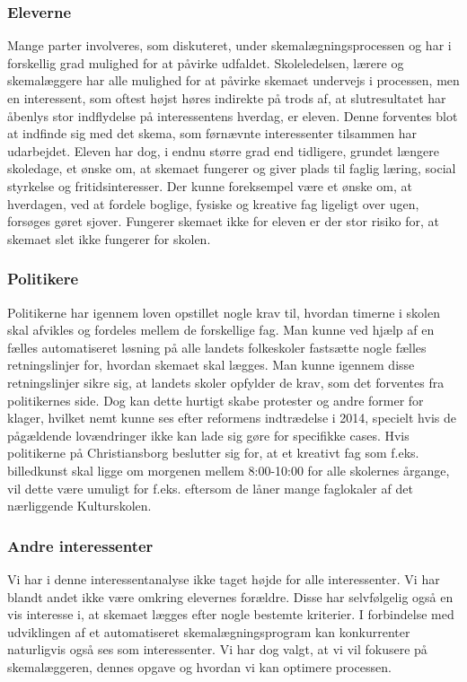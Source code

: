 \subsubsection{Eleverne}
Mange parter involveres, som diskuteret, under skemalægningsprocessen og har i forskellig grad mulighed for at påvirke udfaldet. Skoleledelsen, lærere og skemalæggere har alle mulighed for at påvirke skemaet undervejs i processen, men en interessent, som oftest højst høres indirekte på trods af, at slutresultatet har åbenlys stor indflydelse på interessentens hverdag, er eleven. Denne forventes blot at indfinde sig med det skema, som førnævnte interessenter tilsammen har udarbejdet. Eleven har dog, i endnu større grad end tidligere, grundet længere skoledage, et ønske om, at skemaet fungerer og giver plads til faglig læring, social styrkelse og fritidsinteresser. Der kunne foreksempel være et ønske om, at hverdagen, ved at fordele boglige, fysiske og kreative fag ligeligt over ugen, forsøges gøret sjover. Fungerer skemaet ikke for eleven er der stor risiko for, at skemaet slet ikke fungerer for skolen.

\subsubsection{Politikere}
Politikerne har igennem loven opstillet nogle krav til, hvordan timerne i skolen skal afvikles og fordeles mellem de forskellige fag. Man kunne ved hjælp af en fælles automatiseret løsning på alle landets folkeskoler fastsætte nogle fælles retningslinjer for, hvordan skemaet skal lægges. Man kunne igennem disse retningslinjer sikre sig, at landets skoler opfylder de krav, som det forventes fra politikernes side. Dog kan dette hurtigt skabe protester og andre former for klager, hvilket nemt kunne ses efter reformens indtrædelse i 2014\cite{LaererBrok}, specielt hvis de pågældende lovændringer ikke kan lade sig gøre for specifikke cases. Hvis politikerne på Christiansborg beslutter sig for, at et kreativt fag som f.eks. billedkunst skal ligge om morgenen mellem 8:00-10:00 for alle skolernes årgange, vil dette være umuligt for f.eks. \school eftersom de låner mange faglokaler af det nærliggende Kulturskolen\cite{interview_Kaerby}. 

\subsubsection{Andre interessenter}
Vi har i denne interessentanalyse ikke taget højde for alle interessenter. Vi har blandt andet ikke være omkring elevernes forældre. Disse har selvfølgelig også en vis interesse i, at skemaet lægges efter nogle bestemte kriterier. I forbindelse med udviklingen af et automatiseret skemalægningsprogram kan konkurrenter naturligvis også ses som interessenter. Vi har dog valgt, at vi vil fokusere på skemalæggeren, dennes opgave og hvordan vi kan optimere processen.

